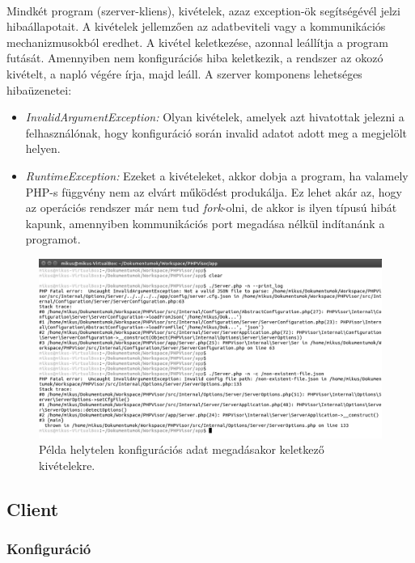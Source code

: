 \documentclass[12pt]{report}
\begin{document}
  \paragraph{}
 Mindkét program (szerver-kliens), kivételek, azaz exception-ök segítségévél jelzi hibaállapotait. A kivételek jellemzően az adatbeviteli vagy a kommunikációs mechanizmusokból eredhet.  A kivétel keletkezése, azonnal leállítja a program futását. Amennyiben nem konfigurációs hiba keletkezik, a rendszer az okozó kivételt, a napló végére írja, majd leáll.	
 A szerver komponens lehetséges hibaüzenetei:
 \begin{itemize}
 \item \textit{InvalidArgumentException:} Olyan kivételek, amelyek azt hivatottak jelezni a felhasználónak, hogy  konfiguráció során invalid adatot adott meg a megjelölt helyen. 
 \item \textit{RuntimeException:} Ezeket a kivételeket, akkor dobja a program, ha valamely PHP-s függvény nem az elvárt működést produkálja. Ez lehet akár az, hogy az operációs rendszer már nem tud \textit{fork}-olni, de akkor is ilyen típusú hibát kapunk, amennyiben kommunikációs port megadása nélkül indítanánk a programot.
 \end{itemize}
  \begin{figure}[ht]
  \centering
  \includegraphics[width=14cm]{pics/runerr.png}
	  \caption{Példa helytelen konfigurációs adat megadásakor keletkező kivételekre. \newline}
      \label{fig:runerr}
  \end{figure}
  
  \pagebreak
\subsection{Client}
\subsubsection{Konfiguráció}
\end{document}
